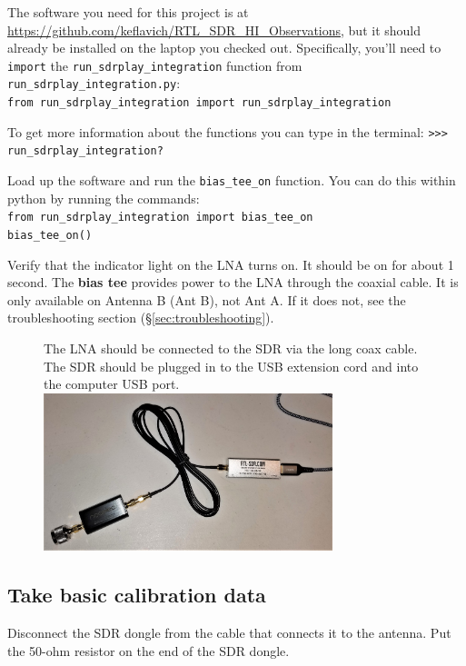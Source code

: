 \documentclass[11pt]{article}
\begin{document}
The software you need for this project is at
\url{https://github.com/keflavich/RTL_SDR_HI_Observations}, but it should
already be installed on the laptop you checked out.  Specifically, you'll need
to \texttt{import} the \texttt{run\_sdrplay\_integration} function from
\texttt{run\_sdrplay\_integration.py}:\\
\verb|from run_sdrplay_integration import run_sdrplay_integration|

To get more information about the functions you can type in the terminal:
   \verb|>>> run_sdrplay_integration?|


Load up the software and run the \texttt{bias\_tee\_on} function.
You can do this within python by running the commands:\\
\verb|from run_sdrplay_integration import bias_tee_on|\\
\verb|bias_tee_on()|


Verify that the indicator light on the LNA turns on.
It should be on for about 1 second.
The \textbf{bias tee} provides power to the LNA through the coaxial cable.
It is only available on Antenna B (Ant B), not Ant A.
If it does not, see the troubleshooting section (\S \ref{sec:troubleshooting}).

\begin{figure}[htp]
    \centering
    \label{fig:adapter_to_lna_to_cable_to_sdr}
    The LNA should be connected to the SDR via the long coax cable.  The SDR should be plugged in
    to the USB extension cord and into the computer USB port.\\
    \includegraphics[width=0.75\textwidth]{RadioLabPhotos/adapter_to_lna_to_cable_to_sdr.jpg}
\end{figure}

\subsection{Take basic calibration data}
Disconnect the SDR dongle from the cable that connects it to the antenna.
Put the 50-ohm resistor on the end of the SDR dongle.
\end{document}
